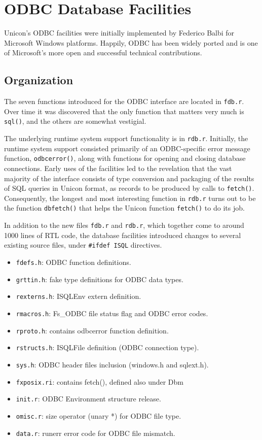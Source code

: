 \chapter{ODBC Database Facilities}

Unicon's ODBC facilities were initially implemented by Federico Balbi
for Microsoft Windows platforms.  Happily, ODBC has been widely ported
and is one of Microsoft's more open and successful technical contributions.

\section{Organization}

The seven functions introduced for the ODBC interface are located
in \texttt{fdb.r}. Over time it was discovered that the only function
that matters very much is \texttt{sql()}, and the others are somewhat
vestigial.

The underlying runtime system support functionality
is in \texttt{rdb.r}.  Initially, the runtime system support consisted
primarily of an ODBC-specific error message function, \texttt{odbcerror()},
along with functions for opening and closing database connections.
Early uses of the facilities led to the revelation that
the vast majority of the interface consists of type
conversion and packaging of the results of SQL queries in Unicon format,
as records to be produced by calls to \texttt{fetch()}. Consequently,
the longest and most interesting function in \texttt{rdb.r} turns out to
be the function \texttt{dbfetch()} that helps the Unicon function
\texttt{fetch()} to do its job.

In addition to the new files \texttt{fdb.r} and \texttt{rdb.r}, which
together come to around 1000 lines of RTL code, the database facilities
introduced changes to several existing source files, under
\texttt{\#ifdef ISQL} directives.

\begin{itemize}
\item \texttt{fdefs.h}: ODBC function definitions.
\item \texttt{grttin.h}: fake type definitions for ODBC data types.
\item \texttt{rexterns.h}: ISQLEnv extern definition.
\item \texttt{rmacros.h}: Fs\_ODBC file status flag and ODBC error codes.
\item \texttt{rproto.h}: contains odbcerror function definition.
\item \texttt{rstructs.h}: ISQLFile definition (ODBC connection type).
\item \texttt{sys.h}: ODBC header files inclusion (windows.h and sqlext.h).
\item \texttt{fxposix.ri}: contains fetch(), defined also under Dbm
\item \texttt{init.r}: ODBC Environment structure release.
\item \texttt{omisc.r}: size operator (unary *) for ODBC file type.
\item \texttt{data.r}: runerr error code for ODBC file mismatch.
\end{itemize}


